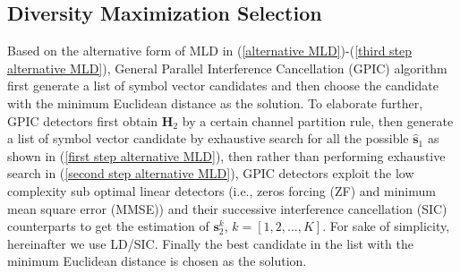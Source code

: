 \documentclass[12pt, draftclsnofoot, onecolumn]{IEEEtran}
\begin{document}
\subsection{Diversity Maximization Selection}\label{DMS analysis}
Based on the alternative form of MLD in (\ref{alternative MLD})-(\ref{third step alternative MLD}), General Parallel Interference Cancellation (GPIC) algorithm first generate a list of symbol vector candidates and then choose the candidate with the minimum Euclidean distance as the solution. To elaborate further, GPIC detectors first obtain $\mathbf{H}_{2}$ by a certain channel partition rule, then generate a list of symbol vector candidate by exhaustive search for all the possible $\hat{\mathbf{s}}_{1}$ as shown in (\ref{first step alternative MLD}), then rather than performing exhaustive search in (\ref{second step alternative MLD}), GPIC detectors exploit the low complexity sub optimal linear detectors (i.e., zeros forcing (ZF) and minimum mean square error (MMSE)) and their successive interference cancellation (SIC) counterparts to get the estimation of $\mathbf{s}^{k}_{2}$, $k=[1,2,\ldots, K]$. For sake of simplicity, hereinafter we use LD/SIC. Finally the best candidate in the list with the minimum Euclidean distance is chosen as the solution. 
\end{document}
